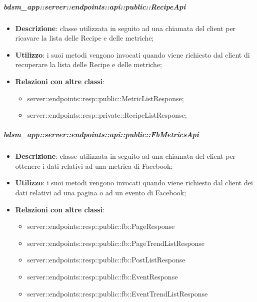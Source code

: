     \subparagraph{bdsm\_app::server::endpoints::api::public::RecipeApi} %
    \label{subp:bdsm_app_server_endpoints_api_public_recipeapi}
    \begin{itemize}
      \item \textbf{Descrizione}: classe utilizzata in seguito ad una chiamata del client per ricavare la lista delle Recipe e delle metriche;
      \item \textbf{Utilizzo}: i suoi metodi vengono invocati quando viene richiesto dal client di recuperare la lista delle Recipe e delle metriche;
      \item \textbf{Relazioni con altre classi}:
        \begin{itemize}
          \item server::endpoints::resp::public::MetricListResponse;
          \item server::endpoints::resp::private::RecipeListResponse;
        \end{itemize}
      \end{itemize}

    \subparagraph{bdsm\_app::server::endpoints::api::public::FbMetricsApi} %
    \label{subp:bdsm_app_server_endpoints_api_public_fbmetricsapi}
    \begin{itemize}
      \item \textbf{Descrizione}: classe utilizzata in seguito ad una chiamata del client per ottenere i dati relativi ad una metrica di Facebook;
      \item \textbf{Utilizzo}: i suoi metodi vengono invocati quando viene richiesto dal client dei dati relativi ad una pagina o ad un evento di Facebook;
      \item \textbf{Relazioni con altre classi}:
        \begin{itemize}
          \item server::endpoints::resp::public::fb::PageResponse
          \item server::endpoints::resp::public::fb::PageTrendListResponse
          \item server::endpoints::resp::public::fb::PostListResponse
          \item server::endpoints::resp::public::fb::EventResponse
          \item server::endpoints::resp::public::fb::EventTrendListResponse
        \end{itemize}
      \end{itemize}

